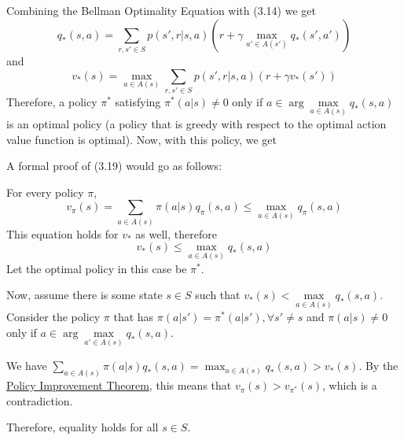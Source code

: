 \documentclass[12pt]{report}
\begin{document}
Combining the Bellman Optimality Equation with (3.14) we get
\begin{equation}
    q_{*}(s, a) = \sum_{r, s' \in S} p(s', r | s, a)(r + \gamma \max_{a' \in A(s')} q_{*}(s', a'))
\end{equation}
and
\begin{equation}
    v_{*}(s) =  \max_{a \in A(s)} \sum_{r, s' \in S} p(s', r | s, a)(r + \gamma v_{*}(s'))
\end{equation}
Therefore, a policy $\pi^{*}$ satisfying $\pi^{*}(a | s) \neq 0$ only if $a \in \arg\max\limits_{a \in A(s)} q_{*}(s, a)$ is an optimal policy (a policy that is greedy with respect to the optimal action value function is optimal). Now, with this policy, we get

A formal proof of (3.19) would go as follows:

For every policy $\pi$,
\begin{equation}
    v_{\pi}(s) = \sum_{a \in A(s)} \pi(a | s) q_{\pi}(s, a) \leq \max_{a \in A(s)} q_{\pi}(s, a)
\end{equation}
This equation holds for $v_{*}$ as well, therefore 
\begin{equation}
    v_{*}(s) \leq \max_{a \in A(s)} q_{*}(s, a)
\end{equation}
Let the optimal policy in this case be $\pi^{*}$.

Now, assume there is some state $s \in S$ such that $v_{*}(s) < \max\limits_{a \in A(s)} q_{*}(s, a)$. Consider the policy $\pi$ that has $\pi(a | s') = \pi^{*}(a | s'), \forall s' \neq s$ and $\pi(a | s) \neq 0$ only if $a \in \arg\max\limits_{a' \in A(s)} q_{*}(s, a)$.

We have $\sum\limits_{a \in A(s)} \pi(a | s) q_{*}(s, a) = \max_{a \in A(s)} q_{*}(s, a) > v_{*}(s)$. By the \hyperref[subsec:PIT]{Policy Improvement Theorem}, this means that $v_{\pi}(s) > v_{\pi^{*}}(s)$, which is a contradiction.

Therefore, equality holds for all $s \in S$.
\end{document}
